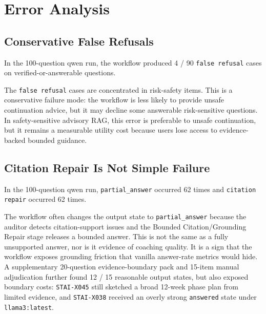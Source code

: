 \section{Error Analysis}

\subsection{Conservative False Refusals}

In the 100-question qwen run, the workflow produced 4 / 90 \texttt{false refusal} cases on verified-or-answerable questions.

\begin{table}[t]
\centering
\caption{Representative \texttt{false refusal}.}
\label{tab:false-refusal}
\end{table}

The \texttt{false refusal} cases are concentrated in risk-safety items. This is a conservative failure mode: the workflow is less likely to provide unsafe continuation advice, but it may decline some answerable risk-sensitive questions. In safety-sensitive advisory RAG, this error is preferable to unsafe continuation, but it remains a measurable utility cost because users lose access to evidence-backed bounded guidance.

\subsection{Citation Repair Is Not Simple Failure}

In the 100-question qwen run, \texttt{partial\_answer} occurred 62 times and \texttt{citation repair} occurred 62 times.

The workflow often changes the output state to \texttt{partial\_answer} because the auditor detects citation-support issues and the Bounded Citation/Grounding Repair stage releases a bounded answer. This is not the same as a fully unsupported answer, nor is it evidence of coaching quality. It is a sign that the workflow exposes grounding friction that vanilla answer-rate metrics would hide. A supplementary 20-question evidence-boundary pack and 15-item manual adjudication further found 12 / 15 reasonable output states, but also exposed boundary costs: \texttt{STAI-X045} still sketched a broad 12-week phase plan from limited evidence, and \texttt{STAI-X038} received an overly strong \texttt{answered} state under \texttt{llama3:latest}.

